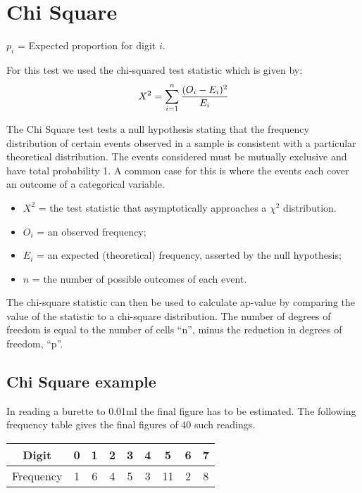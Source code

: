 \documentclass[00-IntroStatsMaster.tex]{subfiles}
\begin{document}
\section{Chi Square}


$p_{i}$ = Expected proportion for digit $i$.

For this test we used the chi-squared test statistic which is given by:
\begin{equation}
X^2 = \sum_{i=1}^{n} {(O_i - E_i)^2 \over E_i}
\end{equation}


The Chi Square test tests a null hypothesis stating that the frequency distribution of certain events observed in a sample is consistent with a particular theoretical distribution. The events considered must be mutually exclusive and have total probability 1. A common case for this is where the events each cover an outcome of a categorical variable.

\begin{itemize}
	\item $X^2$ = the test statistic that asymptotically approaches a $\chi^2$ distribution.
	\item $O_i$ = an observed frequency;
	\item $E_i$ = an expected (theoretical) frequency, asserted by the null hypothesis;
	\item $n $  = the number of possible outcomes of each event.
\end{itemize}

The chi-square statistic can then be used to calculate ap-value by comparing the value of the statistic to a chi-square distribution. The number of degrees of freedom is equal to the number of cells ``n'', minus the reduction in degrees of freedom, ``p''.

\subsection{Chi Square example}
In reading a burette to 0.01ml the final figure has to be estimated.
The following frequency table gives the final figures of 40 such readings.

\begin{center}
\begin{tabular}{|c|c|c|c|c|c|c|c|c|}
	\hline
	Digit & 0 & 1 & 2 & 3 & 4 & 5 & 6 & 7 \\ \hline
	Frequency& 1 & 6 & 4 & 5 & 3 & 11 & 2 & 8 \\
	\hline
\end{tabular}
\end{center}
\end{document}
